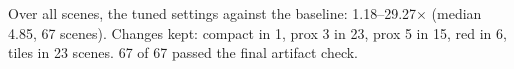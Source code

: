 Over all scenes, the tuned settings against the baseline: 1.18--29.27$\times$ (median 4.85, 67 scenes). Changes kept: compact in 1, prox 3 in 23, prox 5 in 15, red in 6, tiles in 23 scenes. 67 of 67 passed the final artifact check.
